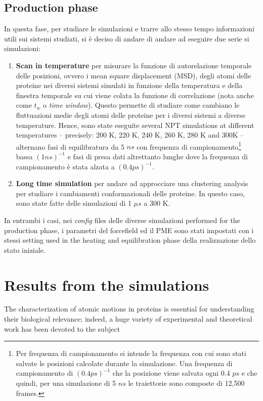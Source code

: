 \subsection{Production phase}
In questa fase, per studiare le simulazioni e trarre allo stesso tempo informazioni utili sui sistemi studiati, si è deciso di andare di andare ad eseguire due serie si simulazioni:
\begin{enumerate}
\item \textbf{Scan in temperature} per misurare la funzione di autorelazione temporale delle posizioni, ovvero i mean square displacement (MSD), degli atomi delle proteine nei diversi sistemi simulati in funzione della temperatura e della finestra temporale su cui viene colata la funzione di correlazione (nota anche come $t_w$ o \textit{time window}). Questo permette di studiare come cambiano le fluttuazioni medie degli atomi delle proteine per i diversi sistemi a diverse temperature. Hence, sono state eseguite several NPT simulations at different temperatures -- precisely: 200 K, 220 K, 240 K, 260 K, 280 K and 300K -- alternano fasi di equilibratura da 5 $ns$ con frequenza di campionamento\footnote{Per frequenza di campionamento si intende la frequenza con cui sono stati salvate le posizioni calcolate durante la simulazione. Una frequenza di campionamento di $(0.4 ps)^{-1}$ che la posizione viene salvata ogni 0.4 $ps$ e che quindi, per una simulazione di 5 $ns$ le traiettorie sono composte di 12,500 frames.} bassa $(1 ns)^{-1}$ e fasi di presa dati altrettanto lunghe dove la frequenza di campionamento è stata alzata a $(0.4 ps)^{-1}$. 
\item \textbf{Long time simulation} per andare ad approcciare una clustering analysis per studiare i cambiamenti conformazionali delle proteine. In questo caso, sono state fatte delle simulazioni di 1 $\mu s$ a 300 K. 
\end{enumerate}
In entrambi i casi, nei \textit{config} files delle diverse simulazioni performed for the production phase, i parametri del forcefield ed il PME sono stati impostati con i stessi setting used in the heating and equilibration phase della realizzazione dello stato iniziale.

\section{Results from the simulations}
The characterization of atomic motions in proteins is essential for understanding their biological relevance; indeed, a huge variety of experimental and theoretical work has been devoted to the subject

